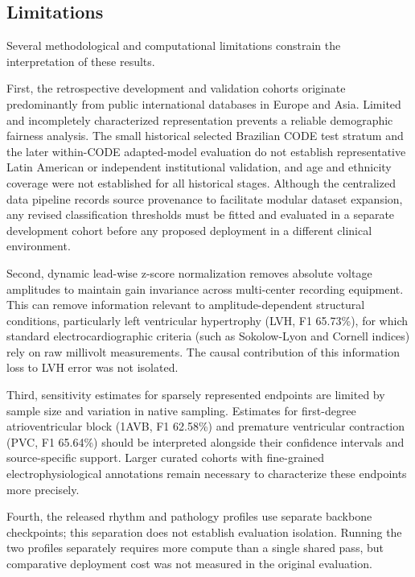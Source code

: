 \documentclass[life,article,submit,moreauthors]{Definitions/mdpi}
\begin{document}




\subsection{Limitations}
\label{sec:limitations}

Several methodological and computational limitations constrain the interpretation of these results.

First, the retrospective development and validation cohorts originate predominantly from public international databases in Europe and Asia. Limited and incompletely characterized representation prevents a reliable demographic fairness analysis. The small historical selected Brazilian CODE test stratum and the later within-CODE adapted-model evaluation do not establish representative Latin American or independent institutional validation, and age and ethnicity coverage were not established for all historical stages. Although the centralized data pipeline records source provenance to facilitate modular dataset expansion, any revised classification thresholds must be fitted and evaluated in a separate development cohort before any proposed deployment in a different clinical environment.

Second, dynamic lead-wise z-score normalization removes absolute voltage amplitudes to maintain gain invariance across multi-center recording equipment. This can remove information relevant to amplitude-dependent structural conditions, particularly left ventricular hypertrophy (LVH, F1 65.73\%), for which standard electrocardiographic criteria (such as Sokolow-Lyon and Cornell indices) rely on raw millivolt measurements. The causal contribution of this information loss to LVH error was not isolated.

Third, sensitivity estimates for sparsely represented endpoints are limited by sample size and variation in native sampling. Estimates for first-degree atrioventricular block (1AVB, F1 62.58\%) and premature ventricular contraction (PVC, F1 65.64\%) should be interpreted alongside their confidence intervals and source-specific support. Larger curated cohorts with fine-grained electrophysiological annotations remain necessary to characterize these endpoints more precisely.

Fourth, the released rhythm and pathology profiles use separate backbone checkpoints; this separation does not establish evaluation isolation. Running the two profiles separately requires more compute than a single shared pass, but comparative deployment cost was not measured in the original evaluation.
\end{document}
